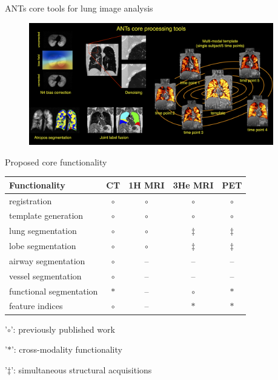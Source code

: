 \documentclass[ignorenonframetext,]{beamer}
\begin{document}
\begin{frame}{ANTs core tools for lung image analysis}

\centering

\begin{figure}
\includegraphics[width=0.95\textwidth]{./lung/figures/coreANtsToolsLung.png}
\end{figure}

\end{frame}

\begin{frame}{Proposed core functionality}

\begin{longtable}[c]{@{}lcccc@{}}
\toprule
\textbf{Functionality} & \textbf{CT} & \textbf{1H MRI} & \textbf{3He
MRI} & \textbf{PET}\tabularnewline
\midrule
\endhead
registration & \(\circ\) & \(\circ\) & \(\circ\) &
\(\circ\)\tabularnewline
template generation & \(\circ\) & \(\circ\) & \(\circ\) &
\(\circ\)\tabularnewline
lung segmentation & \(\circ\) & \(\circ\) & \(\ddagger\) &
\(\ddagger\)\tabularnewline
lobe segmentation & \(\circ\) & \(\circ\) & \(\ddagger\) &
\(\ddagger\)\tabularnewline
airway segmentation & \(\circ\) & -- & -- & --\tabularnewline
vessel segmentation & \(\circ\) & -- & -- & --\tabularnewline
functional segmentation & \(\ast\) & -- & \(\circ\) &
\(\ast\)\tabularnewline
feature indices & \(\circ\) & -- & \(\ast\) & \(\ast\)\tabularnewline
\bottomrule
\end{longtable}

\footnotesize

'\(\circ\)': previously published work

'\(\ast\)': cross-modality functionality

'\(\ddagger\)': simultaneous structural acquisitions

\hypertarget{refs}{}

\end{frame}
\end{document}
